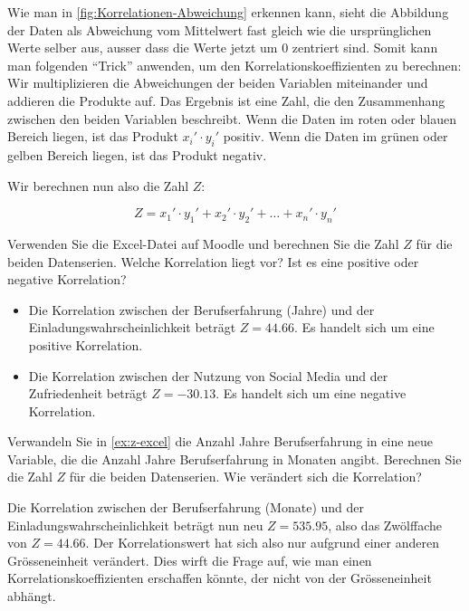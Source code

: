 Wie man in \cref{fig:Korrelationen-Abweichung} erkennen kann, sieht die Abbildung der Daten als Abweichung vom Mittelwert fast gleich wie die ursprünglichen Werte selber aus, ausser dass die Werte jetzt um 0 zentriert sind. Somit kann man folgenden \enquote{Trick} anwenden, um den Korrelationskoeffizienten zu berechnen: Wir multiplizieren die Abweichungen der beiden Variablen miteinander und addieren die Produkte auf. Das Ergebnis ist eine Zahl, die den Zusammenhang zwischen den beiden Variablen beschreibt. Wenn die Daten im roten oder blauen Bereich liegen, ist das Produkt \(x_i' \cdot y_i'\) positiv. Wenn die Daten im grünen oder gelben Bereich liegen, ist das Produkt negativ.

Wir berechnen nun also die Zahl \(Z\):

\[
	Z = x_1' \cdot y_1' + x_2' \cdot y_2' + \dots + x_n' \cdot y_n'
\]


\begin{myexercise}\label{ex:z-excel}
	Verwenden Sie die Excel-Datei auf Moodle und berechnen Sie die Zahl \(Z\) für die beiden Datenserien. Welche Korrelation liegt vor? Ist es eine positive oder negative Korrelation?
	\begin{myanswer}
		\begin{itemize}
			\item Die Korrelation zwischen der Berufserfahrung (Jahre) und der Einladungswahrscheinlichkeit beträgt \(Z = 44.66\). Es handelt sich um eine positive Korrelation.
			\item Die Korrelation zwischen der Nutzung von Social Media und der Zufriedenheit beträgt \(Z = -30.13\). Es handelt sich um eine negative Korrelation.
		\end{itemize}
	\end{myanswer}
\end{myexercise}
\begin{myexercise}\label{ex:z-excel2}
	Verwandeln Sie in \cref{ex:z-excel} die Anzahl Jahre Berufserfahrung in eine neue Variable, die die Anzahl Jahre Berufserfahrung in Monaten angibt. Berechnen Sie die Zahl \(Z\) für die beiden Datenserien. Wie verändert sich die Korrelation?
	\begin{myanswer}
		Die Korrelation zwischen der Berufserfahrung (Monate) und der Einladungswahrscheinlichkeit beträgt nun neu \(Z = 535.95\), also das Zwölffache von \(Z = 44.66\). Der Korrelationswert hat sich also nur aufgrund einer anderen Grösseneinheit verändert. Dies wirft die Frage auf, wie man einen Korrelationskoeffizienten erschaffen könnte, der nicht von der Grösseneinheit abhängt.
	\end{myanswer}
\end{myexercise}

